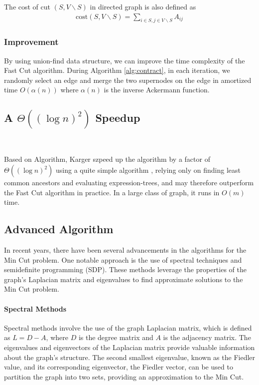 \documentclass[12pt]{article}
\begin{document}
The cost of cut $(S,V\backslash S)$ in directed graph is also defined as
\begin{align*}
    \text{cost}(S,V\backslash S)=\sum_{i\in S, j\in V\backslash S}A_{ij}
\end{align*}

\subsubsection{Improvement}

By using union-find data structure, we can improve the time complexity of the Fast Cut algorithm. During Algorithm \ref{alg:contract}, in each iteration, we randomly select an edge and merge the two supernodes on the edge in amortized time $O(\alpha(n))$ where $\alpha(n)$ is the inverse Ackermann function. 

\subsection{A \texorpdfstring{$\Theta((\log n)^2)$}{Theta((log n)^2)} Speedup}\

Based on Algorithm, Karger szpeed up the algorithm by a factor of $\Theta((\log n)^2)$ using a quite simple algorithm \cite{karger2000minimum}, relying only on finding least common ancestors and evaluating expression-trees, and may
therefore outperform the Fast Cut algorithm in practice. In a large class of graph, it runs in $O(m)$ time.

\subsection{Advanced Algorithm}

In recent years, there have been several advancements in the algorithms for the Min Cut problem. One notable approach is the use of spectral techniques and semidefinite programming (SDP). These methods leverage the properties of the graph's Laplacian matrix and eigenvalues to find approximate solutions to the Min Cut problem.

\paragraph{Spectral Methods}

Spectral methods involve the use of the graph Laplacian matrix, which is defined as $L = D - A$, where $D$ is the degree matrix and $A$ is the adjacency matrix. The eigenvalues and eigenvectors of the Laplacian matrix provide valuable information about the graph's structure. The second smallest eigenvalue, known as the Fiedler value, and its corresponding eigenvector, the Fiedler vector, can be used to partition the graph into two sets, providing an approximation to the Min Cut.
\end{document}
